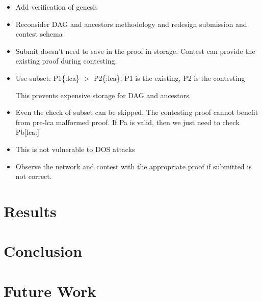 \documentclass{article}
\begin{document}
\begin{itemize}

\item Add verification of genesis
\item Reconsider DAG and ancestors methodology and redesign submission and contest schema
\item Submit doesn't need to save in the proof in storage. Contest can provide the existing proof during contesting.

\item Use subset: P1\{:lca\} $>$ P2\{:lca\}, P1 is the existing, P2 is the contesting

This prevents expensive storage for DAG and ancestors.

\item Even the check of subset can be skipped. The contesting proof cannot benefit from pre-lca malformed proof. If Pa is valid, then we just need to check Pb[lca:]

\item This is not vulnerable to DOS attacks

\item Observe the network and contest with the appropriate proof if submitted is not correct.

\end{itemize}

\section{Results}
\section{Conclusion}
\section{Future Work}
\end{document}
